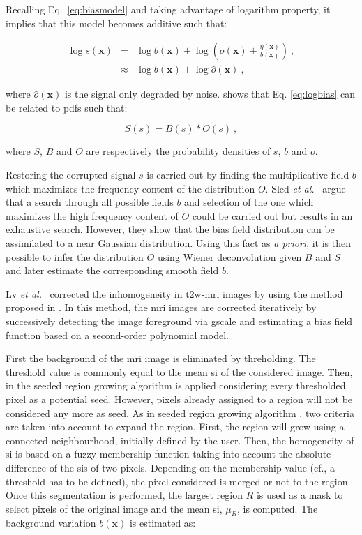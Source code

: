 \begin{enumerate}[leftmargin=*]
{Recalling Eq.~\eqref{eq:biasmodel} and taking advantage of logarithm property, it implies that this model becomes additive such that:

\begin{eqnarray}
	\log s(\mathbf{x}) & = & \log b(\mathbf{x}) + \log \left( o(\mathbf{x}) + \frac{\eta(\mathbf{x})}{b(\mathbf{x})} \right) \ , \nonumber \\
	& \approx & \log b(\mathbf{x}) + \log \hat{o}(\mathbf{x}) \ , \label{eq:logbias}
\end{eqnarray}

\noindent where $\hat{o}(\mathbf{x})$ is the signal only degraded by noise. \cite{Sled1998} shows that Eq. \eqref{eq:logbias} can be related to \acp{pdf} such that:

\begin{equation}
	S(s) = B(s) * O(s) \ ,
	\label{eq:distrbias} 
\end{equation}

\noindent where $S$, $B$ and $O$ are respectively the probability densities of $s$, $b$ and $o$.

Restoring the corrupted signal $s$ is carried out by finding the multiplicative field $b$ which maximizes the frequency content of the distribution $O$.
Sled \textit{et al.}~\cite{Sled1998} argue that a search through all possible fields $b$ and selection of the one which maximizes the high frequency content of $O$ could be carried out but results in an exhaustive search.
However, they show that the bias field distribution can be assimilated to a near Gaussian distribution.
Using this fact as \textit{a priori}, it is then possible to infer the distribution $O$ using Wiener deconvolution given $B$ and $S$ and later estimate the corresponding smooth field $b$.
}

Lv \textit{et al.}~\cite{Lv2009} corrected the inhomogeneity in \ac{t2w}-\ac{mri} images by using the method proposed in \cite{Madabhushi2006}.
In this method, the \ac{mri} images are corrected iteratively by successively detecting the image foreground via \ac{gscale} and estimating a bias field function based on a second-order polynomial model. 
{\color{blue}
First the background of the \ac{mri} image is eliminated by threholding.
The threshold value is commonly equal to the mean \ac{si} of the considered image.
Then, in the seeded region growing algorithm is applied considering every thresholded pixel as a potential seed.
However, pixels already assigned to a region will not be considered any more as seed.
As in seeded region growing algorithm \cite{Shapiro2001}, two criteria are taken into account to expand the region.
First, the region will grow using a connected-neighbourhood, initially defined by the user.
Then, the homogeneity of \ac{si} is based on a fuzzy membership function taking into account the absolute difference of the \acp{si} of two pixels.
Depending on the membership value (cf., a threshold has to be defined), the pixel considered is merged or not to the region.
Once this segmentation is performed, the largest region $R$ is used as a mask to select pixels of the original image and the mean \ac{si}, $\mu_{R}$, is computed. 
The background variation $b(\mathbf{x})$ is estimated as:

}
\end{enumerate}
